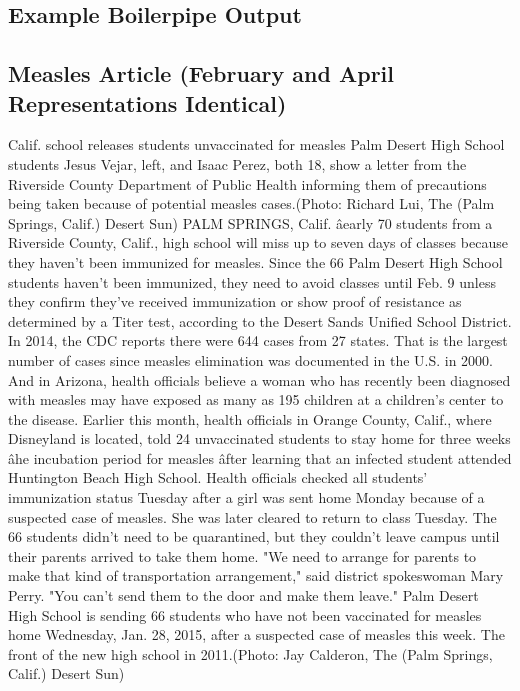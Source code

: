 \documentclass[a4paper,12pt]{article}
\begin{document}
\clearpage
\begin{appendices}
\section{Example Boilerpipe Output}
\subsection{Measles Article (February and April Representations Identical)}
Calif. school releases students unvaccinated for measles
Palm Desert High School students Jesus Vejar, left, and Isaac Perez, both 18, show a letter from the Riverside County Department of Public Health informing them of precautions being taken because of potential measles cases.(Photo: Richard Lui, The (Palm Springs, Calif.) Desert Sun)
PALM SPRINGS, Calif. âearly 70 students from a Riverside County, Calif., high school will miss up to seven days of classes because they haven't been immunized for measles.
Since the 66 Palm Desert High School students haven't been immunized, they need to avoid classes until Feb. 9 unless they confirm they've received immunization or show proof of resistance as determined by a Titer test, according to the Desert Sands Unified School District.
In 2014, the CDC reports there were 644 cases from 27 states. That is the largest number of cases since measles elimination was documented in the U.S. in 2000.
And in Arizona, health officials believe a woman who has recently been diagnosed with measles may have exposed as many as 195 children at a children's center to the disease.
Earlier this month, health officials in Orange County, Calif., where Disneyland is located, told 24 unvaccinated students to stay home for three weeks âhe incubation period for measles âfter learning that an infected student attended Huntington Beach High School.
Health officials checked all students' immunization status Tuesday after a girl was sent home Monday because of a suspected case of measles. She was later cleared to return to class Tuesday.
The 66 students didn't need to be quarantined, but they couldn't leave campus until their parents arrived to take them home.
"We need to arrange for parents to make that kind of transportation arrangement," said district spokeswoman Mary Perry. "You can't send them to the door and make them leave."
Palm Desert High School is sending 66 students who have not been vaccinated for measles home Wednesday, Jan. 28, 2015, after a suspected case of measles this week. The front of the new high school in 2011.(Photo: Jay Calderon, The (Palm Springs, Calif.) Desert Sun)

\end{appendices}
\end{document}
